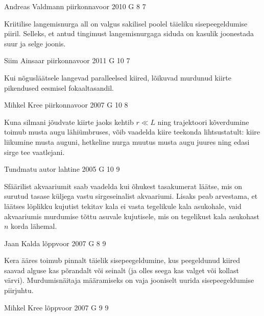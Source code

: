 \documentclass[11pt]{article}
\begin{document}
{%
{Andreas Valdmann} %
{piirkonnavoor} %
{2010} %
{G 8} %
{7} %
{

\ifHint
Kriitilise langemisnurga all on valgus sakilisel poolel täieliku sisepeegeldumise piiril. Selleks, et antud tingimust langemisnurgaga siduda on kasulik joonestada suur ja selge joonis.
\fi
}

{Siim Ainsaar} %
{piirkonnavoor} %
{2011} %
{G 10} %
{7} %
{

\ifHint
Kui nõgusläätsele langevad paralleelsed kiired, lõikuvad
murdunud kiirte pikendused eesmisel fokaaltasandil.
\fi
}

{Mihkel Kree} %
{piirkonnavoor} %
{2007} %
{G 10} %
{8} %
{

\ifHint
Kuna silmani jõudvate kiirte jaoks kehtib $r \ll L$ ning trajektoori kõverdumine toimub musta augu lähiümbruses, võib vaadelda kiire teekonda lihtsustatult: kiire liikumine musta auguni, hetkeline nurga muutus musta augu juures ning edasi sirge tee vaatlejani.
\fi
}

{Tundmatu autor} %
{lahtine} %
{2005} %
{G 10} %
{9} %
{

\ifHint
Sfäärilist akvaariumit saab vaadelda kui õhukest tasakumerat läätse, mis on surutud tasase küljega vastu sirgeseinalist akvaariumi. Lisaks peab arvestama, et läätses lõplikku kujutist tekitav kala ei vasta tegelikule kala asukohale, vaid akvaariumis murdumise tõttu asuvale kujutisele, mis on tegelikust kala asukohast $n$ korda lähemal.
\fi
}

{Jaan Kalda} %
{lõppvoor} %
{2007} %
{G 8} %
{9} %
{

\ifHint
Kera ääres toimub pinnalt täielik sisepeegeldumine, kus peegeldunud kiired saavad alguse kas põrandalt või seinalt (ja olles seega kas valget või kollast värvi). Murdumisnäitaja määramiseks on vaja jooniselt uurida sisepeegeldumise piirjuhtu.
\fi
}

{Mihkel Kree} %
{lõppvoor} %
{2007} %
{G 9} %
{9} %
{

}}
\end{document}
